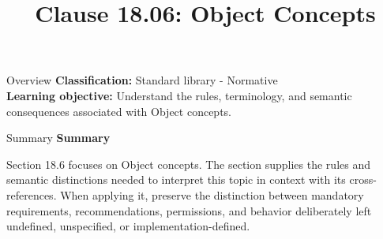 \documentclass[10pt,letterpaper]{article}
\title{Clause 18.06: Object Concepts}
\author{}
\date{}
\begin{document}
\maketitle
\begin{CornellOverviewBox}{Overview}
\textbf{Classification:} Standard library - Normative\\[2pt]
\textbf{Learning objective:} Understand the rules, terminology, and semantic consequences associated with Object concepts.
\end{CornellOverviewBox}\begin{CornellSummaryBox}{Summary}
{\sffamily\bfseries\color{Accent} Summary}\par\vspace{3pt}Section 18.6 focuses on Object concepts. The section supplies the rules and semantic distinctions needed to interpret this topic in context with its cross-references. When applying it, preserve the distinction between mandatory requirements, recommendations, permissions, and behavior deliberately left undefined, unspecified, or implementation-defined.
\end{CornellSummaryBox}
\end{document}
